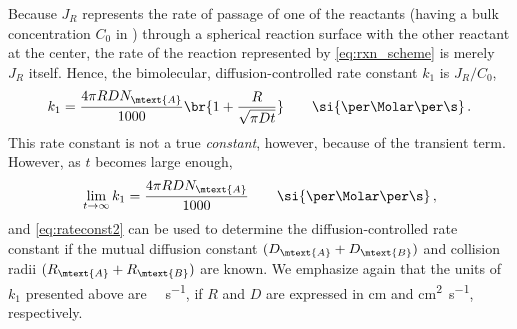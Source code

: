 Because \( J_R \) represents the rate of passage of one of the reactants (having a bulk concentration \( C_0 \) in \si{\Molar}) through a spherical reaction surface with the other reactant at the center, the rate of the reaction represented by \cref{eq:rxn_scheme} is merely \( J_R \) itself. 
Hence, the bimolecular, diffusion-controlled rate constant \( k_1 \) is \( J_R/C_0 \),
\begin{equation}
	k_1 = \frac{4 \pi R D N_\mtext{A}}{1000} \br{ 1 + \frac{R}{\sqrt{\pi D t}}} \qquad \si{\per\Molar \per\s} \, .
	\label{eq:rateconst1}
\end{equation} 
This rate constant is not a true \emph{constant}, however, because of the transient term. 
However, as \( t \) becomes large enough,
\begin{equation}
	\lim_{t \to \infty} k_1 = \frac{4 \pi R D N_\mtext{A}}{1000} \qquad \si{\per\Molar \per\s} \, ,
	\label{eq:rateconst2}
\end{equation}
and \cref{eq:rateconst2} can be used to determine the diffusion-controlled rate constant if the mutual diffusion constant \( (D_\mtext{A} + D_\mtext{B}) \) and collision radii \( (R_\mtext{A} + R_\mtext{B}) \) are known.
We emphasize again that the units of \( k_1 \) presented above are \si{\per\Molar \per \s}, if \( R \) and \( D \) are expressed in \si{\cm} and \si{\cm\squared \per \s}, respectively. 

